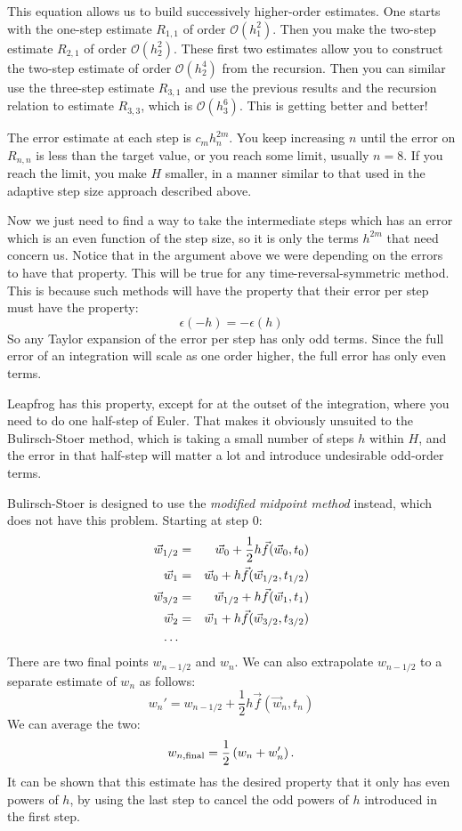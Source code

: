 This equation allows us to build successively higher-order
estimates. One starts with the one-step estimate $R_{1,1}$ of order
$\mathcal{O}(h_1^2)$. Then you make the two-step estimate $R_{2,1}$ of
order $\mathcal{O}(h_2^2)$. These first two estimates allow you to
construct the two-step estimate of order $\mathcal{O}(h_2^4)$ from the
recursion. Then you can similar use the three-step estimate $R_{3,1}$
and use the previous results and the recursion relation to estimate
$R_{3,3}$, which is $\mathcal{O}(h_3^6)$. This is getting better and
better!

The error estimate at each step is $c_mh_n^{2m}$. You keep increasing
$n$ until the error on $R_{n,n}$ is less than the target value, or you
reach some limit, usually $n=8$. If you reach the limit, you make $H$
smaller, in a manner similar to that used in the adaptive step size
approach described above. 

Now we just need to find a way to take the intermediate steps which
has an error which is an even function of the step size, so it is only
the terms $h^{2m}$ that need concern us. Notice that in the argument
above we were depending on the errors to have that property. This will
be true for any time-reversal-symmetric method. This is because such
methods will have the property that their error per step must have the
property:
\begin{equation}
\epsilon(-h) = - \epsilon(h)
\end{equation}
So any Taylor expansion of the error per step has only odd
terms. Since the full error of an integration will scale as one order
higher, the full error has only even terms.

Leapfrog has this property, except for at the outset of the
integration, where you need to do one half-step of Euler. That makes
it obviously unsuited to the Bulirsch-Stoer method, which is taking a
small number of steps $h$ within $H$, and the error in that half-step
will matter a lot and introduce undesirable odd-order terms.

Bulirsch-Stoer is designed to use the {\it modified midpoint method}
instead, which does not have this problem. Starting at step $0$:
\begin{eqnarray}
\vec{w}_{1/2} &=& \vec{w}_{0} + \frac{1}{2} h \vec{f}(\vec{w}_0, t_0) \cr
\vec{w}_{1} &=& \vec{w}_{0} + h \vec{f}(\vec{w}_{1/2}, t_{1/2}) \cr
\vec{w}_{3/2} &=& \vec{w}_{1/2} + h \vec{f}(\vec{w}_{1}, t_{1}) \cr
\vec{w}_{2} &=& \vec{w}_{1} + h \vec{f}(\vec{w}_{3/2}, t_{3/2}) \cr
\ldots
\end{eqnarray}
There are two final points $w_{n-1/2}$ and $w_{n}$. We can also extrapolate
$w_{n-1/2}$ to a separate estimate of $w_n$ as follows:
\begin{equation}
w_n' = w_{n-1/2} + \frac{1}{2} h \vec{f}(\vec{w}_{n}, t_{n})
\end{equation}
We can average the two:
\begin{equation}
w_{n, {\rm final}} = \frac{1}{2}\left(w_n + w_n'\right).
\end{equation}
It can be shown that this estimate has the desired property that it
only has even powers of $h$, by using the last step to cancel the odd
powers of $h$ introduced in the first step.

